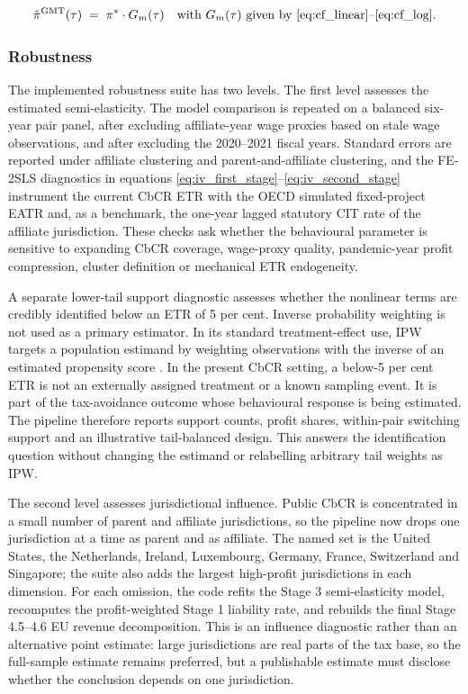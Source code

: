 \documentclass[11pt,a4paper]{article}
\begin{document}
\begin{equation}\label{eq:counterfactual_profit}
\hat{\pi}^{\text{GMT}}(\tau) \;=\; \pi^{*} \cdot G_m(\tau) \quad \text{with } G_m(\tau) \text{ given by \eqref{eq:cf_linear}--\eqref{eq:cf_log}.}
\end{equation}

\subsubsection{Robustness}\label{sec:estimation_robustness}

The implemented robustness suite has two levels. The first level assesses the estimated semi-elasticity. The model comparison is repeated on a balanced six-year pair panel, after excluding affiliate-year wage proxies based on stale wage observations, and after excluding the 2020--2021 fiscal years. Standard errors are reported under affiliate clustering and parent-and-affiliate clustering, and the FE-2SLS diagnostics in equations \eqref{eq:iv_first_stage}--\eqref{eq:iv_second_stage} instrument the current CbCR ETR with the OECD simulated fixed-project EATR and, as a benchmark, the one-year lagged statutory CIT rate of the affiliate jurisdiction. These checks ask whether the behavioural parameter is sensitive to expanding CbCR coverage, wage-proxy quality, pandemic-year profit compression, cluster definition or mechanical ETR endogeneity.

A separate lower-tail support diagnostic assesses whether the nonlinear terms are credibly identified below an ETR of 5 per cent. Inverse probability weighting is not used as a primary estimator. In its standard treatment-effect use, IPW targets a population estimand by weighting observations with the inverse of an estimated propensity score \citep{hirano2003}. In the present CbCR setting, a below-5 per cent ETR is not an externally assigned treatment or a known sampling event. It is part of the tax-avoidance outcome whose behavioural response is being estimated. The pipeline therefore reports support counts, profit shares, within-pair switching support and an illustrative tail-balanced design. This answers the identification question without changing the estimand or relabelling arbitrary tail weights as IPW.

The second level assesses jurisdictional influence. Public CbCR is concentrated in a small number of parent and affiliate jurisdictions, so the pipeline now drops one jurisdiction at a time as parent and as affiliate. The named set is the United States, the Netherlands, Ireland, Luxembourg, Germany, France, Switzerland and Singapore; the suite also adds the largest high-profit jurisdictions in each dimension. For each omission, the code refits the Stage 3 semi-elasticity model, recomputes the profit-weighted Stage 1 liability rate, and rebuilds the final Stage 4.5--4.6 EU revenue decomposition. This is an influence diagnostic rather than an alternative point estimate: large jurisdictions are real parts of the tax base, so the full-sample estimate remains preferred, but a publishable estimate must disclose whether the conclusion depends on one jurisdiction.
\end{document}
